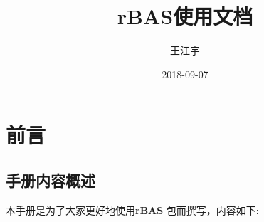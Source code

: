 \documentclass[]{ctexbook}
\title{rBAS使用文档}
\author{王江宇}
\date{2018-09-07}
\theoremstyle{definition}
\theoremstyle{definition}
\theoremstyle{definition}
\theoremstyle{remark}
\begin{document}
\maketitle

{
\setcounter{tocdepth}{2}
\tableofcontents
}
\listoftables
\listoffigures
\mainmatter

\chapter*{前言}


\section*{手册内容概述}


本手册是为了大家更好地使用\textbf{rBAS}
\citep{R-rBAS}包而撰写，内容如下:
\end{document}
